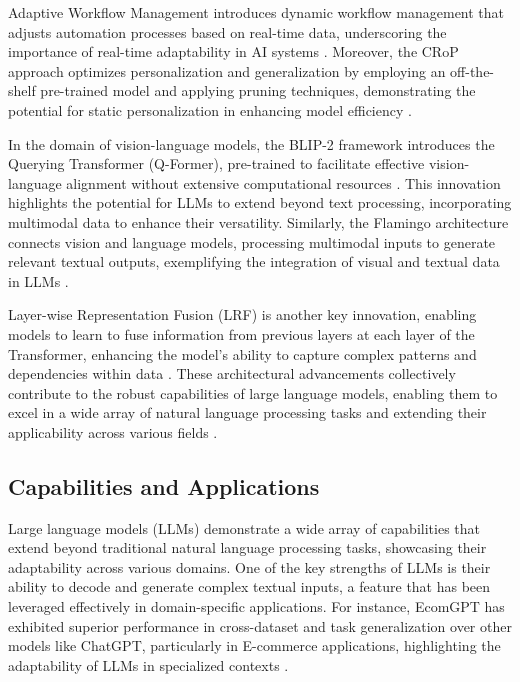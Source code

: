 Adaptive Workflow Management introduces dynamic workflow management that adjusts automation processes based on real-time data, underscoring the importance of real-time adaptability in AI systems \cite{pandy2024advancementsroboticsprocessautomation}. Moreover, the CRoP approach optimizes personalization and generalization by employing an off-the-shelf pre-trained model and applying pruning techniques, demonstrating the potential for static personalization in enhancing model efficiency \cite{kaur2024cropcontextwiserobuststatic}.

In the domain of vision-language models, the BLIP-2 framework introduces the Querying Transformer (Q-Former), pre-trained to facilitate effective vision-language alignment without extensive computational resources \cite{li2023blip}. This innovation highlights the potential for LLMs to extend beyond text processing, incorporating multimodal data to enhance their versatility. Similarly, the Flamingo architecture connects vision and language models, processing multimodal inputs to generate relevant textual outputs, exemplifying the integration of visual and textual data in LLMs \cite{alayrac2022flamingo}.

Layer-wise Representation Fusion (LRF) is another key innovation, enabling models to learn to fuse information from previous layers at each layer of the Transformer, enhancing the model's ability to capture complex patterns and dependencies within data \cite{zheng2023layerwiserepresentationfusioncompositional}. These architectural advancements collectively contribute to the robust capabilities of large language models, enabling them to excel in a wide array of natural language processing tasks and extending their applicability across various fields \cite{kasneci2023chatgpt}.


\subsection{Capabilities and Applications} \label{subsec:Capabilities and Applications}



Large language models (LLMs) demonstrate a wide array of capabilities that extend beyond traditional natural language processing tasks, showcasing their adaptability across various domains. One of the key strengths of LLMs is their ability to decode and generate complex textual inputs, a feature that has been leveraged effectively in domain-specific applications. For instance, EcomGPT has exhibited superior performance in cross-dataset and task generalization over other models like ChatGPT, particularly in E-commerce applications, highlighting the adaptability of LLMs in specialized contexts \cite{li2023ecomgptinstructiontuninglargelanguage}.



